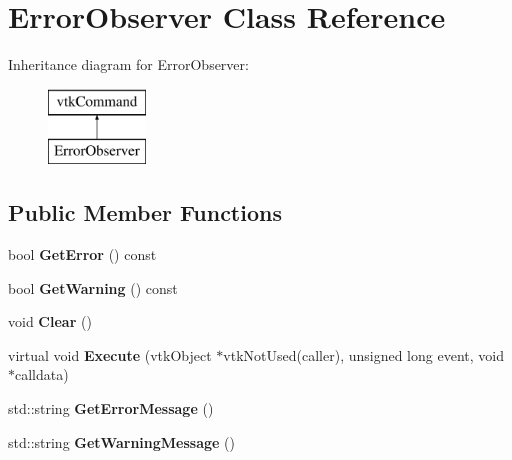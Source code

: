 \hypertarget{class_error_observer}{}\section{Error\+Observer Class Reference}
\label{class_error_observer}
Inheritance diagram for Error\+Observer\+:\begin{figure}[H]
\begin{center}
\leavevmode
\includegraphics[height=2.000000cm]{class_error_observer}
\end{center}
\end{figure}
\subsection*{Public Member Functions}
\begin{DoxyCompactItemize}
\item 
\hypertarget{class_error_observer_a9e8da079cec071e384ddaa6e97af84c9}{}bool {\bfseries Get\+Error} () const \label{class_error_observer_a9e8da079cec071e384ddaa6e97af84c9}

\item 
\hypertarget{class_error_observer_a91d1cf38346f8973d3cd915d8f8946ae}{}bool {\bfseries Get\+Warning} () const \label{class_error_observer_a91d1cf38346f8973d3cd915d8f8946ae}

\item 
\hypertarget{class_error_observer_a368511a8ecda76d9681739ddc5588a5d}{}void {\bfseries Clear} ()\label{class_error_observer_a368511a8ecda76d9681739ddc5588a5d}

\item 
\hypertarget{class_error_observer_af2bebb0e4aa18f6b1c260ef7aa9ee55d}{}virtual void {\bfseries Execute} (vtk\+Object $\ast$vtk\+Not\+Used(caller), unsigned long event, void $\ast$calldata)\label{class_error_observer_af2bebb0e4aa18f6b1c260ef7aa9ee55d}

\item 
\hypertarget{class_error_observer_a97218477be7fa8ea2643d4ee8c691b03}{}std\+::string {\bfseries Get\+Error\+Message} ()\label{class_error_observer_a97218477be7fa8ea2643d4ee8c691b03}

\item 
\hypertarget{class_error_observer_ab5f5b9a966760a173fb123e14c02a081}{}std\+::string {\bfseries Get\+Warning\+Message} ()\label{class_error_observer_ab5f5b9a966760a173fb123e14c02a081}

\end{DoxyCompactItemize}
